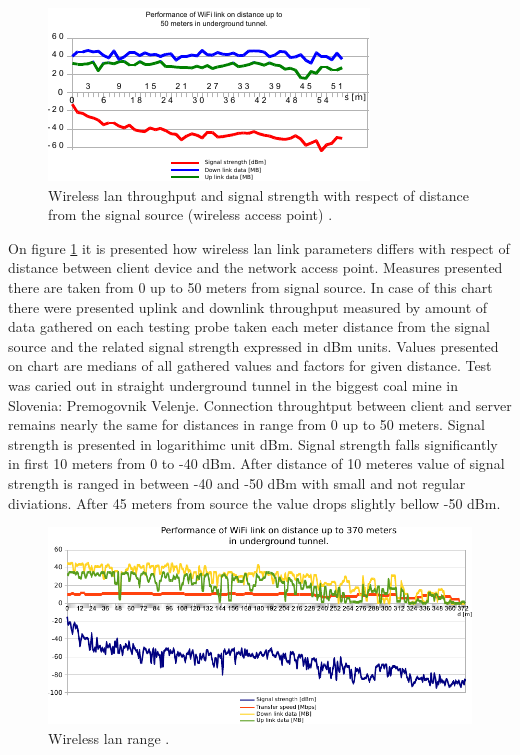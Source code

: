 \documentclass[../main.tex]{subfiles}
\begin{document}
\begin{figure}[!htbp]
\includegraphics[width=\textwidth]{pictures/wifi_link_short.pdf}
\centering
\caption{Wireless lan throughput and signal strength with respect of distance from the signal source (wireless access point) \cite{Thesis_CM}. }
\label{fig:wifi_link_short}
\end{figure}


On figure \ref{fig:wifi_link_short} it is presented how wireless lan link parameters differs with respect of distance between client device and the network access point. Measures presented there are taken from 0 up to 50 meters from signal source. In case of this chart there were presented uplink and downlink throughput measured by amount of data gathered on each testing probe taken each meter distance from the signal source and the related signal strength expressed in dBm units. Values presented on chart are medians of all gathered values and factors for given distance. Test was caried out in straight underground tunnel in the biggest coal mine in Slovenia: Premogovnik Velenje. Connection throughtput between client and server remains nearly the same for distances in range from 0 up to 50 meters. Signal strength is presented in logarithimc unit dBm. Signal strength falls significantly in first 10 meters from 0 to -40 dBm. After distance of 10 meteres value of signal strength is ranged in between -40 and -50 dBm with small and not regular diviations. After 45 meters from source the value drops slightly bellow -50 dBm.

\begin{figure}[!htbp]
\includegraphics[width=\textwidth]{pictures/wifi_link_long.pdf}
\centering
\caption{Wireless lan range \cite{Thesis_CM}. }
\label{fig:wifi_link_long}
\end{figure}
\end{document}
